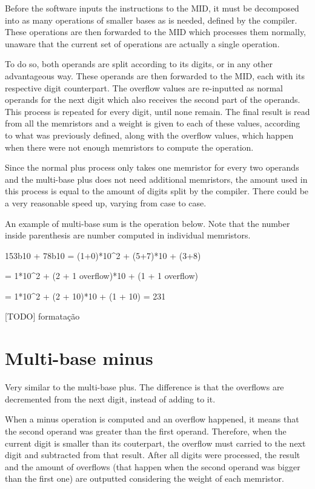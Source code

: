 \documentclass[ecp,tc,english]{iiufrgs}
\begin{document}
Before the software inputs the instructions to the MID, it must be decomposed into as many operations of smaller bases as is needed, defined by the compiler. These operations are then forwarded to the MID which processes them normally, unaware that the current set of operations are actually a single operation.

To do so, both operands are split according to its digits, or in any other advantageous way. These operands are then forwarded to the MID, each with its respective digit counterpart. The overflow values are re-inputted as normal operands for the next digit which also receives the second part of the operands. This process is repeated for every digit, until none remain. The final result is read from all the memristors and a weight is given to each of these values, according to what was previously defined, along with the overflow values, which happen when there were not enough memristors to compute the operation.

Since the normal plus process only takes one memristor for every two operands and the multi-base plus does not need additional memristors, the amount used in this process is equal to the amount of digits split by the compiler. There could be a very reasonable speed up, varying from case to case.

An example of multi-base sum is the operation below. Note that the number inside parenthesis are number computed in individual memristors.

153b10 + 78b10 = (1+0)*10^2 + (5+7)*10 + (3+8)

= 1*10^2 + (2 + 1 overflow)*10 + (1 + 1 overflow)

= 1*10^2 + (2 + 10)*10 + (1 + 10) = 231

[TODO] formatação

\section{Multi-base minus}

Very similar to the multi-base plus. The difference is that the overflows are decremented from the next digit, instead of adding to it.

When a minus operation is computed and an overflow happened, it means that the second operand was greater than the first operand. Therefore, when the current digit is smaller than its couterpart, the overflow must carried to the next digit and subtracted from that result. After all digits were processed, the result and the amount of overflows (that happen when the second operand was bigger than the first one) are outputted considering the weight of each memristor.
\end{document}
